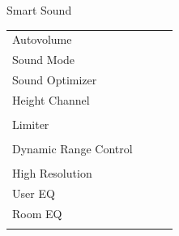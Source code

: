 \documentclass{beamer}
\begin{document}
\begin{frame}[t]{Smart Sound}
\begin{tiny}
\begin{tabular}{@{}lccc@{}}
				Autovolume & \color{black}{Off} & & \\
				Sound Mode & \color{black}{Off} & & \\
				Sound Optimizer & \color{black}{Off} & & \\
				Height Channel & \color{black}{Off} & & \\
				\color{blue}{Automatic Scene Classificiation} & \color{blue}{On} & & \\
				Limiter & \color{black}{Off} & & \\
				\color{blue}{Sound Stage Expansion} & \color{blue}{On} & & \\
				Dynamic Range Control & \color{black}{Off} & & \\
				\color{blue}{Smart Sound Controller} & \color{blue}{On} & & \\
				High Resolution & \color{black}{Off} & & \\
				User EQ & \color{black}{Off} & & \\
				Room EQ & \color{black}{Off} & & \\
				\color{blue}{OSD Volume} & \color{blue}{On} &  \color{blue}{Vol.40} & \\
				\midrule
			\end{tabular}
		\end{tiny}
		
	\end{frame}
	
\end{document}
